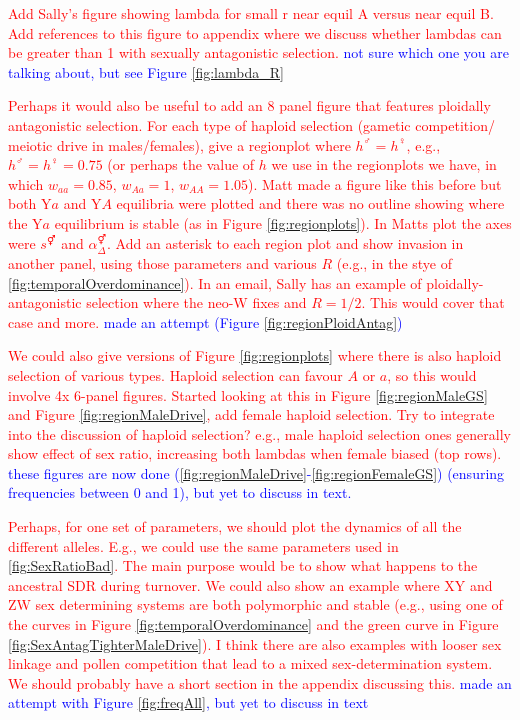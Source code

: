 \documentclass[12pt]{article}
\begin{document}
\newpage
\textcolor{red}{
Add Sally's figure showing lambda for small r near equil A versus near equil B. Add references to this figure to appendix where we discuss whether lambdas can be greater than 1 with sexually antagonistic selection.}
\textcolor{blue}{not sure which one you are talking about, but see Figure \ref{fig:lambda_R} }

\textcolor{red}{
Perhaps it would also be useful to add an 8 panel figure that features ploidally antagonistic selection. For each type of haploid selection (gametic competition/ meiotic drive in males/females), give a regionplot where $h^\male=h^\female$, e.g., $h^\male=h^\female=0.75$ (or perhaps the value of $h$ we use in the regionplots we have, in which $w_{aa}=0.85$, $w_{Aa}=1$, $w_{AA}=1.05$). 
Matt made a figure like this before but both Y$a$ and Y$A$ equilibria were plotted and there was no outline showing where the Y$a$ equilibrium is stable (as in Figure \ref{fig:regionplots}). In Matts plot the axes were $s^\Hermaphrodite$ and $\alpha_{\Delta}^\Hermaphrodite$. 
Add an asterisk to each region plot and show invasion in another panel, using those parameters and various $R$ (e.g., in the stye of \ref{fig:temporalOverdominance}). 
In an email, Sally has an example of ploidally-antagonistic selection where the neo-W fixes and $R=1/2$. This would cover that case and more. }
\textcolor{blue}{
made an attempt (Figure \ref{fig:regionPloidAntag})
}

\textcolor{red}{
We could also give versions of Figure \ref{fig:regionplots} where there is also haploid selection of various types.
Haploid selection can favour $A$ or $a$, so this would involve 4x 6-panel figures. Started looking at this in Figure \ref{fig:regionMaleGS} and Figure \ref{fig:regionMaleDrive}, add female haploid selection. 
Try to integrate into the discussion of haploid selection? e.g., male haploid selection ones generally show effect of sex ratio, increasing both lambdas when female biased (top rows).}
\textcolor{blue}{
these figures are now done (\ref{fig:regionMaleDrive}-\ref{fig:regionFemaleGS}) (ensuring frequencies between 0 and 1), but yet to discuss in text.}

\textcolor{red}{
Perhaps, for one set of parameters, we should plot the dynamics of all the different alleles. E.g., we could use the same parameters used in \ref{fig:SexRatioBad}. The main purpose would be to show what happens to the ancestral SDR during turnover. 
We could also show an example where XY and ZW sex determining systems are both polymorphic and stable (e.g., using one of the curves in Figure \ref{fig:temporalOverdominance} and the green curve in Figure \ref{fig:SexAntagTighterMaleDrive}). 
I think there are also examples with looser sex linkage and pollen competition that lead to a mixed sex-determination system. We should probably have a short section in the appendix discussing this. 
}
\textcolor{blue}{made an attempt with Figure \ref{fig:freqAll}, but yet to discuss in text}
\end{document}
